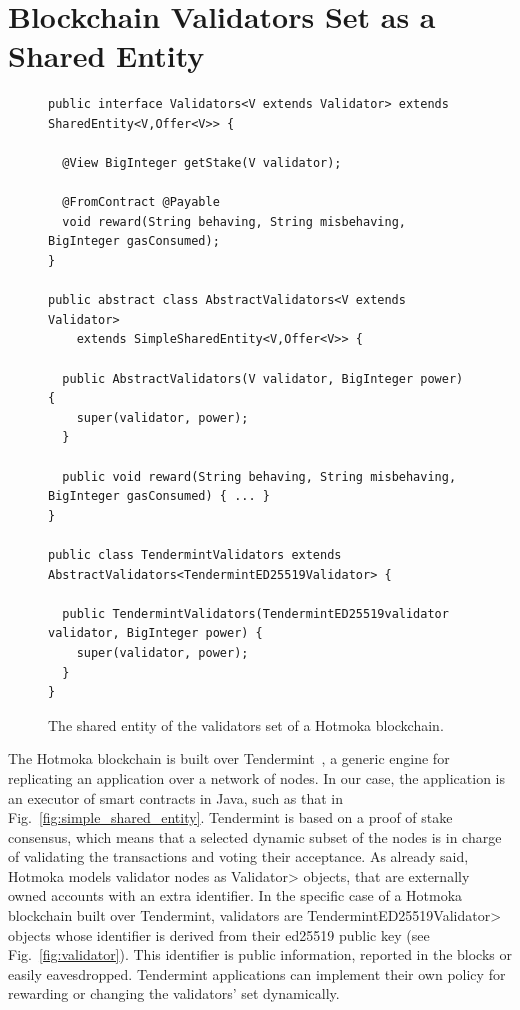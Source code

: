 \section{Blockchain Validators Set as a Shared Entity}\label{sec:validators}





\begin{figure}[t]
  \begin{center}
    \begin{lstlisting}[language=Takamaka]
public interface Validators<V extends Validator> extends SharedEntity<V,Offer<V>> {

  @View BigInteger getStake(V validator);

  @FromContract @Payable
  void reward(String behaving, String misbehaving, BigInteger gasConsumed);
}

public abstract class AbstractValidators<V extends Validator>
    extends SimpleSharedEntity<V,Offer<V>> {

  public AbstractValidators(V validator, BigInteger power) {
    super(validator, power);
  }

  public void reward(String behaving, String misbehaving, BigInteger gasConsumed) { ... }
}

public class TendermintValidators extends AbstractValidators<TendermintED25519Validator> {

  public TendermintValidators(TendermintED25519validator validator, BigInteger power) {
    super(validator, power);
  }
}
    \end{lstlisting}
  \end{center}
  \caption{The shared entity of the validators set of a Hotmoka blockchain.}\label{fig:validators}
\end{figure}

The Hotmoka blockchain is built over Tendermint~\cite{Kwon14}, a
generic engine for replicating an application over a network of nodes. In our case,
the application is an executor of smart contracts in Java, such as that in
Fig.~\ref{fig:simple_shared_entity}. Tendermint is based on a proof of stake
consensus, which means that a selected dynamic subset of the nodes is in charge of
validating the transactions and voting their acceptance. 
As already said,
Hotmoka models validator nodes as \<Validator> objects, that are externally owned accounts
with an extra identifier. In the specific case of a Hotmoka blockchain built over Tendermint,
validators are \<TendermintED25519Validator> objects whose
identifier is derived from their ed25519 public key (see Fig.~\ref{fig:validator}).
This identifier is public information, reported in the blocks or easily eavesdropped.
Tendermint applications can implement their own
policy for rewarding or changing the validators' set dynamically.

